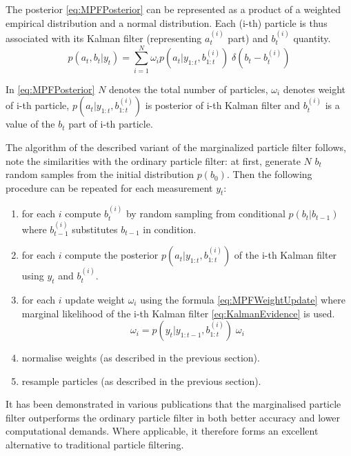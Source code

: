 The posterior {\pdf} \eqref{eq:MPFPosterior} can be represented as a product of a weighted empirical
distribution and a normal distribution. Each (i-th) particle is thus associated with its Kalman filter
(representing \(a_t^{(i)}\) part) and \(b_t^{(i)}\) quantity.
\begin{equation} \label{eq:MPFPosterior}
	p(a_t, b_t | y_t) = \sum_{i=1}^N \omega_i p(a_t|y_{1:t},b_{1:t}^{(i)}) \; \delta(b_t - b_t^{(i)})
\end{equation}

In \eqref{eq:MPFPosterior} \(N\) denotes the total number of particles, \(\omega_i\) denotes weight
of i-th particle, \(p(a_t|y_{1:t},b_{1:t}^{(i)})\) is posterior {\pdf} of i-th Kalman
filter and \(b_t^{(i)}\) is a value of the \(b_t\) part of i-th particle.

The algorithm of the described variant of the marginalized particle filter follows, note the
similarities with the ordinary particle filter: at first, generate \(N\) \(b_t\) random samples from
the initial distribution \(p(b_0)\). Then the following procedure can be repeated for each measurement
\(y_t\):
\begin{enumerate}
	\item for each \(i\) compute \(b_t^{(i)}\) by random sampling from conditional {\pdf}
		\(p(b_t|b_{t-1})\) where \(b_{t-1}^{(i)}\) substitutes \(b_{t-1}\) in condition.
	\item for each \(i\) compute the posterior {\pdf} \(p(a_t|y_{1:t},b_{1:t}^{(i)})\) of the i-th
		Kalman filter using \(y_t\) and \(b_t^{(i)}\).
	\item for each \(i\) update weight \(\omega_i\) using the formula \eqref{eq:MPFWeightUpdate} where
		marginal likelihood of the i-th Kalman filter \eqref{eq:KalmanEvidence} is used.
		\begin{equation} \label{eq:MPFWeightUpdate}
			\omega_i = p(y_t|y_{1:t-1},b_{1:t}^{(i)}) \; \omega_i
		\end{equation}
	\item normalise weights (as described in the previous section).
	\item resample particles (as described in the previous section).
\end{enumerate}

It has been demonstrated in various publications that the marginalised particle filter outperforms
the ordinary particle filter in both better accuracy and lower computational demands. Where
applicable, it therefore forms an excellent alternative to traditional particle filtering.
